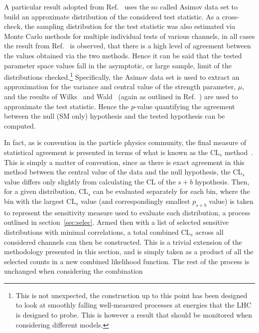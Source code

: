 \documentclass[floatfix]{article}
\begin{document}
A particular result adopted from Ref.~\cite{Cowan:2010js} uses the so called Asimov data set to build an approximate distribution of the considered test statistic. 
As a cross-check, the sampling distribution for the test statistic was also estimated via Monte Carlo methods for multiple individual tests of various channels, 
in all cases the result from Ref.~\cite{Cowan:2010js} is observed, that there is a high level of agreement between the values obtained via the two methods. Hence it can be said
that the tested parameter space values fall in the asymptotic, or large sample, limit of the distributions checked.\footnote{This is not unexpected, the
construction up to this point has been designed to look at smoothly falling well-measured processes at energies that the LHC is designed to probe. This is however a 
result that should be monitored when considering different models.} Specifically, the Asimov data set is used to extract an approximation for the variance and central value of the strength parameter, $\mu$, and the results of Wilks~\cite{Wilks:1938dza} and Wald~\cite{Wald:1943:EWM} (again as outlined in Ref.~\cite{Cowan:2010js}) 
are used to approximate the test statistic. 
Hence the $p$-value quantifying the agreement between the null (SM only) hypothesis and the tested hypothesis can be computed. 

In fact, as is convention in the particle physics community, the final measure of statistical agreement is presented in terms of what is known as the CL$_{s}$ 
method~\cite{Junk:1999kv,Read:2002hq}. This is simply a matter of convention, since as there is exact agreement in this method between the central value of the 
data and the null hypothesis, the CL$_{s}$ value differs only slightly from calculating the CL of the $s+b$ hypothesis. Then, for a given distribution, CL$_{s}$ 
can be evaluated separately for each bin, where the bin with the largest CL$_{s}$ value (and correspondingly smallest $p_{s+b}$ value) is taken to represent the 
sensitivity measure used to evaluate each distribution, a process outlined in section~\ref{sec:selec}. Armed then with a list of selected sensitive 
distributions with minimal correlations, a total combined CL$_{s}$ across all considered channels can then be constructed. This is a trivial extension of 
the methodology presented in this section, and is simply taken as a product of all the selected counts in a new combined likelihood function. 
The rest of the process is unchanged when considering the combination
\end{document}
